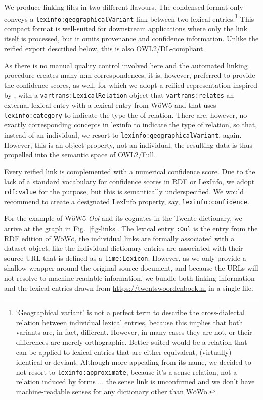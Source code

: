 \documentclass[11pt]{article}
\newcommand{\word}[1]{\textsl{#1}} %
\newcommand{\code}[1]{\texttt{#1}} %
\newcommand{\onto}[1]{\texttt{#1}} %
\begin{document}
\begin{enumerate}
We produce linking files in two different flavours. The condensed format only conveys a \onto{lexinfo:geographicalVariant} link between two lexical entries.\footnote{
    `Geographical variant' is not a perfect term to describe the cross-dialectal relation between individual lexical entries, because this implies that both variants are, in fact, different. However, in many cases they are not, or their differences are merely orthographic. Better suited would be a relation that can be applied to lexical entries that are either equivalent, (virtually) identical or deviant. 
    Although more appealing from its name, we decided to not resort to \onto{lexinfo:approximate}, because it's a sense relation, not a relation induced by forms ... the sense link is unconfirmed and we don't have machine-readable senses for any dictionary other than WöWö.
}
This compact format is well-suited for downstream applications where only the link itself is processed, but it omits provenance and confidence information. Unlike the reified export described below, this is also OWL2/DL-compliant. 

As there is no manual quality control involved here and the automated linking procedure creates many n:m correspondences, it is, however, preferred to provide the confidence scores, as well, for which we adopt a reified representation inspired by \citet{gillis2023refinement}, with a \code{vartrans:LexicalRelation} object that \code{vartrans:relates} an external lexical entry with a lexical entry from WöWö and that uses \code{lexinfo:category} to indicate the type the of relation. There are, however, no exactly corresponding concepts in lexinfo to indicate the type of relation, so that, instead of an individual, we resort to \onto{lexinfo:geographicalVariant}, again. However, this is an object property, not an individual, the resulting data is thus propelled into the semantic space of OWL2/Full.

Every reified link is complemented with a numerical confidence score. Due to the lack of a standard vocabulary for confidence scores in RDF or LexInfo, we adopt \onto{rdf:value} for the purpose, but this is semantically underspecified. We would recommend to create a designated LexInfo property, say, \onto{lexinfo:confidence}.

For the example of WöWö \word{Ool} and its cognates in the Twente dictionary, we arrive at the graph in Fig.\ \ref{fig-links}. The lexical entry \onto{:Ool} is the entry from the RDF edition of WöWö, the individual links are formally associated with a dataset object, like the individual dictionary entries are associated with their source URL that is defined as a \onto{lime:Lexicon}. However, as we only provide a shallow wrapper around the original source document, and because the URLs will not resolve to machine-readable information, we bundle both linking information and the lexical entries drawn from \url{https://twentswoordenboek.nl} in a single file.


\end{enumerate}
\end{document}
